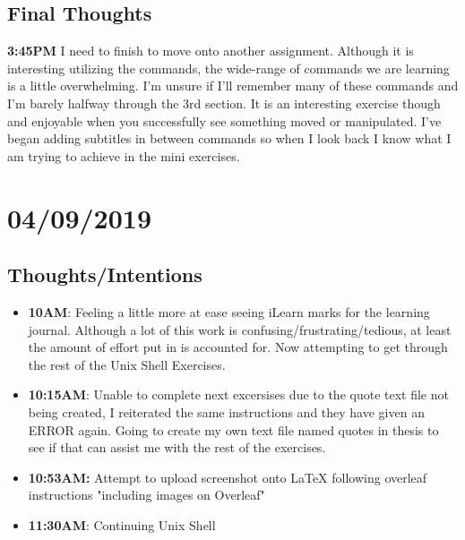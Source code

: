 \documentclass{article}
\begin{document}
\subsection{Final Thoughts}
\textbf{3:45PM} I need to finish to move onto another assignment. Although it is interesting utilizing the commands, the wide-range of commands we are learning is a little overwhelming. I'm unsure if I'll remember many of these commands and I'm barely halfway through the 3rd section. It is an interesting exercise though and enjoyable when you successfully see something moved or manipulated. I've began adding subtitles in between commands so when I look back I know what I am trying to achieve in the mini exercises.

\section{04/09/2019}
\subsection{Thoughts/Intentions}
\begin{itemize}
\item \textbf{10AM}: Feeling a little more at ease seeing iLearn marks for the learning journal. Although a lot of this work is confusing/frustrating/tedious, at least the amount of effort put in is accounted for. Now attempting to get through the rest of the Unix Shell Exercises.
\item \textbf{10:15AM}: Unable to complete next excersises due to the quote text file not being created, I reiterated the same instructions and they have given an ERROR again. Going to create my own text file named quotes in thesis to see if that can assist me with the rest of the exercises.
\item \textbf{10:53AM:} Attempt to upload screenshot onto LaTeX following overleaf instructions "including images on Overleaf"
\item \textbf{11:30AM}: Continuing Unix Shell
\end{itemize}
\end{document}

